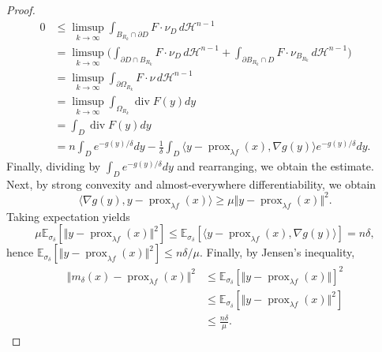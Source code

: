 \documentclass[10pt,a4paper]{amsart}
\begin{document}
\begin{proof}
\begin{equation*}
\begin{aligned}
    0&\leq \limsup_{k\to \infty} \int_{ B_{R_k}\cap \partial D }  F\cdot \nu_D\, d\mathcal{H}^{n-1}\\
    &=\limsup_{k\to \infty}\Big(\int_{\partial D\cap  {B}_{R_k}  }  F\cdot \nu_D\, d\mathcal{H}^{n-1}+\int_{\partial {B}_{R_k}\cap D}  F\cdot \nu_{{B}_{R_k}}\, d\mathcal{H}^{n-1}\Big)\\
    &=\limsup_{k\to \infty}\int_{\partial \Omega_{R_k}} F\cdot \nu\, d\mathcal{H}^{n-1}\\
    &=\limsup_{k\to \infty}\int_{\Omega_{R_k}} \operatorname{div}F(y)dy\\
    &=\int_D \operatorname{div}F(y)dy\\
    &=n\int_D e^{-g(y)/\delta}dy-\frac{1}{\delta}\int_D \langle y-\operatorname{prox}_{\lambda f}(x),\nabla g(y)\rangle e^{-g(y)/\delta}dy.
\end{aligned}
\end{equation*}
Finally, dividing by $\int_{D}e^{-g(y)/\delta}dy$ and rearranging, we obtain the estimate. 
Next, by strong convexity and almost-everywhere differentiability, we obtain
$$
\langle \nabla g(y),y-\operatorname{prox}_{\lambda f}(x)\rangle \geq \mu \Vert y-\operatorname{prox}_{\lambda f}(x)\Vert^2.
$$
Taking expectation yields
$$
\mu \mathbb{E}_{\sigma_{\delta}}\left[\Vert y-\operatorname{prox}_{\lambda f}(x)\Vert^2\right]\leq\mathbb{E}_{\sigma_{\delta}}\left[\langle y-\operatorname{prox}_{\lambda f}(x),\nabla g(y)\rangle \right]=n\delta,
$$
hence $\mathbb{E}_{\sigma_{\delta}}\left[\Vert y-\operatorname{prox}_{\lambda f}(x)\Vert^2\right]\leq n\delta /\mu$. Finally, by Jensen's inequality, 
\begin{equation*}
    \begin{aligned}
  \Vert m_{\delta}(x)-\operatorname{prox}_{\lambda f}(x)\Vert^2&\leq \mathbb{E}_{\sigma_{\delta}}\left[\Vert y-\operatorname{prox}_{\lambda f}(x)\Vert\right]^2\\
  &\leq  \mathbb{E}_{\sigma_{\delta}}\left[\Vert y-\operatorname{prox}_{\lambda f}(x)\Vert^2\right]\\
  &\leq \frac{n\delta}{\mu}.    
    \end{aligned}
\end{equation*}
\end{proof}
\end{document}
